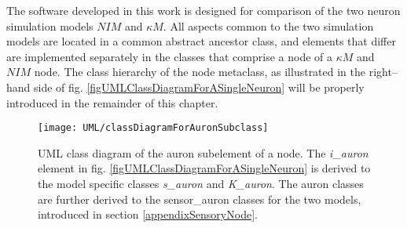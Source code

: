 		The software developed in this work is designed for comparison of the two neuron simulation models $NIM$ and $\kappa M$.
		All aspects common to the two simulation models are located in a common abstract ancestor class, and elements that differ are implemented separately in the classes that comprise a node of a $\kappa M$ and $NIM$ node.
		The class hierarchy of the node metaclass, as illustrated in the right--hand side of fig. \ref{figUMLClassDiagramForASingleNeuron} will be properly introduced in the remainder of this chapter.

\begin{figure}[htb!p]
	\centering
	\centerline{ %
	\texttt{[image: UML/classDiagramForAuronSubclass]}}
	\caption[UML class diagram for the auron subelement of a node, $NIM$ and $\kappa M$]{
		UML class diagram of the auron subelement of a node.
		The \emph{i\_auron} element in fig. \ref{figUMLClassDiagramForASingleNeuron} is derived to the model specific classes \emph{s\_auron} and \emph{K\_auron}.
		The auron classes are further derived to the sensor\_auron classes for the two models, introduced in section \ref{appendixSensoryNode}.
		}
	\label{figUMLClassDiagramForAuronElementForNIMandKM}
\end{figure}


